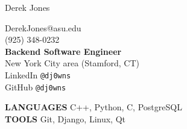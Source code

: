 \documentclass[10pt,oneside]{article}
\makeatletter
\newcommand{\name}{Derek Jones}
\newcommand{\cellphone}{(925) 348-0232}
\newcommand{\email}{DerekJones@asu.edu}
\newcommand{\github}{GitHub \texttt{@dj0wns}}
\newcommand{\linkedin}{LinkedIn \texttt{@dj0wns}}
\newcommand{\languages}{C++, Python, C, PostgreSQL}
\newcommand{\tools}{Git, Django, Linux, Qt}
\newcommand{\bigname}[1]{
  \begin{center}\huge#1\end{center}
}
\makeatother
\begin{document}
 \selectfont

\bigname{\name}
\vspace{-5pt}
\begin{flushleft}
 \begin{multicols}{3}
  \email \\
  \cellphone \\
  \centering \textbf{Backend Software Engineer} \\
  \centering New York City area (Stamford, CT) \\
  \hfill\linkedin \\
  \hfill\github \\
 \end{multicols}
\end{flushleft}

\begin{center}
 \begin{multicols}{2}
  \textbf{\uppercase{Languages}} \languages \\
  \textbf{\uppercase{Tools}} \tools \\
 \end{multicols}
\end{center}

\vspace{-5 pt}
\end{document}
